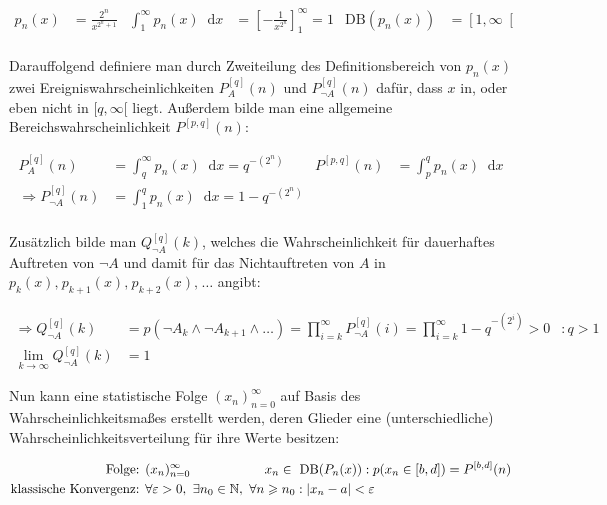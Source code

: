 \documentclass[a4paper]{scrartcl}
\newcommand*\dif{\mathop{}\!\mathrm{d}}
\begin{document}
\begin{align*}
p_{n}(x) &= \frac{2^n}{x^{2^n+1}} & \int_{1}^{\infty} p_{n}(x) \dif x&= \left[ -\frac{1}{x^{2^n}} \right]_1^{\infty} = 1 & \text{DB} \left(p_{n}(x)\right) &= \left[ 1,\infty\right[\\
\end{align*}
\begin{minipage}[t]{0.84\linewidth}
\vspace*{-0.8cm}
Darauffolgend definiere man durch Zweiteilung des Definitionsbereich von $p_{n}(x)$ zwei Ereigniswahrscheinlichkeiten $P^{[q]}_A(n)$ und $P^{[q]}_{\neg{A}}(n)$ dafür, dass $x$ in, oder eben nicht in $[q,\infty[$ liegt. Außerdem bilde man eine allgemeine Bereichswahrscheinlichkeit $P^{[p,q]}(n)$:
\end{minipage}
\begin{align*}
P^{[q]}_A(n) &= \int_{q}^{\infty} p_{n}(x) \dif x = q^{-(2^n)} & P^{[p,q]}(n) &= \int_{p}^{q} p_{n}(x) \dif x\\
\Rightarrow P^{[q]}_{\neg{A}}(n) &= \int_{1}^{q} p_{n}(x) \dif x = 1-q^{-(2^n)}\\
\end{align*}	
\begin{minipage}[t]{0.84\linewidth}
\vspace*{-0.8cm}
Zusätzlich bilde man $Q_{\neg{A}}^{[q]}(k)$, welches die Wahrscheinlichkeit für dauerhaftes Auftreten von $\neg A$ und damit für das Nichtauftreten von $A$ in $p_k(x),\hspace{1pt} p_{k+1}(x),\hspace{1pt} p_{k+2}(x),\hspace{1pt} \ldots$ angibt:
\end{minipage}
\begin{align*}
\Rightarrow \textstyle{Q}_{\neg{A}}^{[q]}(k) &= p({\neg A}_{k}\wedge{\neg A}_{k+1}\wedge\ldots) = \prod_{i=k}^{\infty} P^{[q]}_{\neg{A}}(i) = \prod_{i=k}^\infty 1-q^{-(2^i)} >0 &:{q>1	}\\
 \lim_{k \rightarrow \infty} {Q}_{\neg{A}}^{[q]}(k)&=1
\end{align*}
\begin{minipage}[t]{0.84\linewidth}
Nun kann eine statistische Folge $(x_n)_{n=0}^{\infty}$ auf Basis des Wahrscheinlichkeitsmaßes erstellt werden, deren Glieder eine (unterschiedliche) Wahrscheinlichkeitsverteilung für ihre Werte besitzen:
\end{minipage}
\vspace*{-0.3cm}
\begin{align*}
\text{Folge: }& (x_n)_{n=0}^{\infty} \hspace*{2cm} x_n \in \text{ DB}(P_{n}(x)) : p(x_n\in [b,d]) = P^{[b,d]}(n)\\
\text{klassische Konvergenz: }& \forall\varepsilon > 0, ~\exists n_0 \in \mathbb{N}, ~\forall n \geqslant n_0 : | x_n - a| < \varepsilon
\end{align*}
\end{document}
